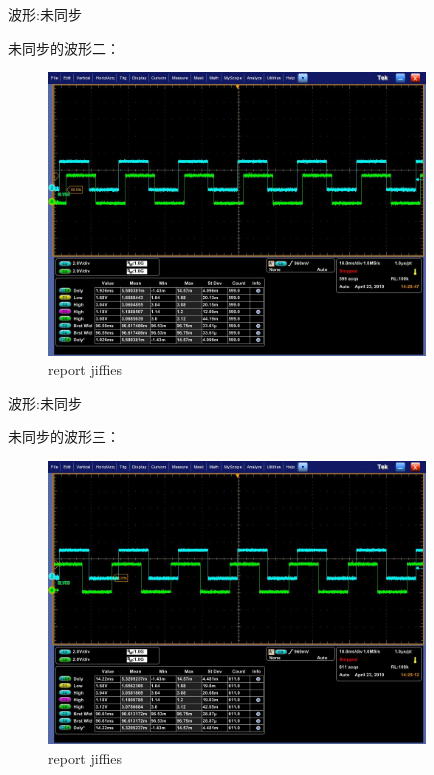\begin{frame}[fragile]{波形:未同步}

未同步的波形二：

  \begin{figure}[htbp]
  \begin{center}
  \includegraphics[width=10cm]{img/nosync2}
  \caption{report jiffies}
  \label{report}
  \end{center}
  \vspace{-0.5em}
  \end{figure}


\end{frame}


\begin{frame}[fragile]{波形:未同步}

未同步的波形三：

  \begin{figure}[htbp]
  \begin{center}
  \includegraphics[width=10cm]{img/nosync3}
  \caption{report jiffies}
  \label{report}
  \end{center}
  \vspace{-0.5em}
  \end{figure}


\end{frame}


